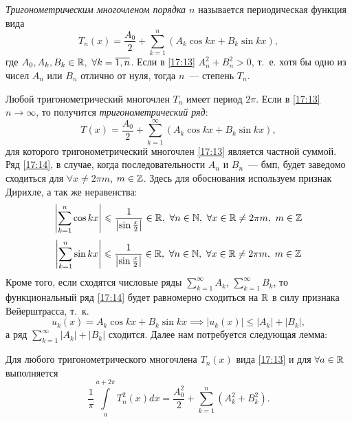 \documentclass[../../main.tex]{subfiles}
\begin{document}
\emph{Тригонометрическим многочленом порядка $n$} называется периодическая 
функция 
вида
\begin{equation}
\label{17:13}
T_n(x) = \frac{A_0}{2} + \sum_{k=1}^{n} \left( A_k \cos{kx} + B_k 
\sin{kx}\right),
\end{equation}
где $A_0,A_k,B_k \in \mathbb{R},\ \forall k = \overline{1,n}$. Если в \eqref{17:13} 
$A_n ^ 2 + B_n ^ 2 > 0$, т.~е. хотя бы одно из чисел $A_n$ или $B_n$ отлично 
от нуля, 
тогда $n$~--- степень $T_n$.

Любой тригонометрический многочлен $T_n$ имеет период $2\pi$. Если в 
\eqref{17:13} $n \to \infty$, то получится \emph{тригонометрический ряд}:
\begin{equation}
\label{17:14}
T(x) = \frac{A_0}{2} + \sum_{k=1}^{\infty} \left( A_k \cos{kx} + B_k 
\sin{kx}\right),
\end{equation}
для которого тригонометрический многочлен \eqref{17:13} является частной 
суммой. Ряд \eqref{17:14}, в случае, когда последовательности $A_n$ и 
$B_n$~--- бмп,
будет заведомо сходиться для $\forall x \ne 2\pi m$, $m \in \mathbb{Z}$. Здесь для 
обоснования используем признак Дирихле, а так же неравенства:
\[  \left| \sum_{k=1}^{n} \cos{kx} \right| \leqslant \frac{1}{ \left| 
\sin{\frac{x}{2}} \right| } \in \mathbb{R},\ \forall n \in \mathbb{N},\ \forall x \in \mathbb{R} \ne 
2\pi m,\ m \in \mathbb{Z}      \]
\[  \left| \sum_{k=1}^{n} \sin{kx} \right| \leqslant \frac{1}{ \left| 
\sin{\frac{x}{2}}\right| } \in \mathbb{R},\ \forall n \in \mathbb{N},\ \forall x \in \mathbb{R} \ne 
2\pi m,\ m \in \mathbb{Z}    \]
Кроме того, если сходятся числовые ряды
$\sum\limits_{k=1}^{\infty} A_k$, $\sum\limits_{k=1}^{\infty} B_k$,
то функциональный ряд \eqref{17:14} будет равномерно сходиться на $\mathbb{R}$ в силу 
признака Вейерштрасса, т.~к.
\[ u_k(x) = A_k \cos{kx} + B_k \sin{kx}  \implies \left| u_k(x)\right|  \le 
\left| A_k \right| + \left| B_k \right|,  \]
а ряд
$\sum\limits_{k=1}^{\infty} \left| A_k \right| + \left| B_k \right|$
сходится. Далее нам потребуется следующая лемма:
\begin{lemma}
	Для любого тригонометрического многочлена $T_n(x)$ вида \eqref{17:13} и для 
	$\forall a \in \mathbb{R}$ выполняется
	\begin{equation}
	\label{17:15}
	\frac{1}{\pi} \int\limits_{a}^{a+2\pi} T_n^2(x)dx = \frac{A_0^2}{2} + 
	\sum_{k=1}^{n} \left( A_k^2 + B_k^2 \right).
	\end{equation}
\end{lemma}
\end{document}
